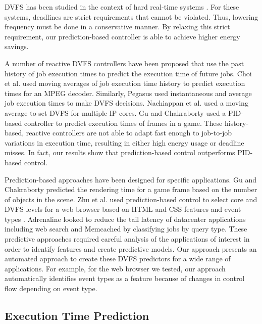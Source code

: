 DVFS has been studied in the context of hard real-time systems
\cite{rtdvfs-systor12}. For these systems, deadlines are strict requirements
that cannot be violated. Thus, lowering frequency must be done in a
conservative manner.  By relaxing this strict requirement, our prediction-based
controller is able to achieve higher energy savings.

A number of reactive DVFS controllers have been proposed that use the past
history of job execution times to predict the execution time of future jobs.
Choi et al. \cite{choi-iccad02} used moving averages of job execution time
history to predict execution times for an MPEG decoder. Similarly, Pegasus
\cite{pegasus-isca14} used instantaneous and average job execution times to
make DVFS decisions. Nachiappan et al. \cite{nachiappan-hpca15} used a moving
average to set DVFS for multiple IP cores. Gu and Chakraborty \cite{gu-dac08}
used a PID-based controller to predict execution times of frames in a game.
These history-based, reactive controllers are not able to adapt fast enough to
job-to-job variations in execution time, resulting in either high energy usage
or deadline misses. In fact, our results show that prediction-based control
outperforms PID-based control.

Prediction-based approaches have been designed for specific applications. Gu
and Chakraborty \cite{gu-rtas08} predicted the rendering time for a game frame
based on the number of objects in the scene. Zhu et al. used prediction-based
control to select core and DVFS levels for a web browser based on HTML and CSS
features \cite{zhu-hpca13} and event types \cite{eqos-hpca15}. Adrenaline
\cite{adrenaline-hpca15} looked to reduce the tail latency of datacenter
applications including web search and Memcached by classifying jobs by query
type. These predictive approaches required careful analysis of the applications
of interest in order to identify features and create predictive models.  Our
approach presents an automated approach to create these DVFS predictors for a
wide range of applications. For example, for the web browser we tested, our
approach automatically identifies event types as a feature because of changes
in control flow depending on event type.

\subsection{Execution Time Prediction}

